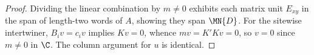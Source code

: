 \begin{proof}
    \leanok
    Dividing the linear combination by $m \ne 0$ exhibits each matrix unit
    $E_{xy}$ in the span of length-two words of $A$, showing they span
    $\MN{D}$. For the sitewise intertwiner, $B_i v = c_i v$ implies $K v = 0$,
    whence $m v = K' K v = 0$, so $v = 0$ since $m \ne 0$ in $\C$. The column
    argument for $u$ is identical.
\end{proof}
